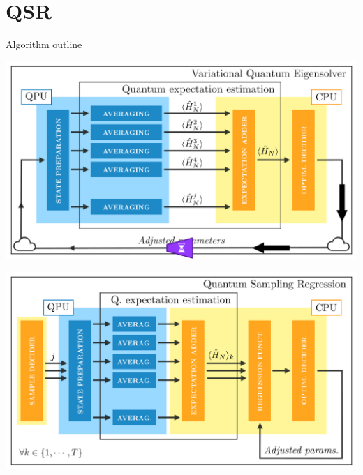 
\section{QSR}


\begin{frame}[allowframebreaks]{Algorithm outline}

  \begin{minipage}[c]{\linewidth}
    \begin{center}
      \includegraphics[width=.7\paperwidth]{Figures/VQE-bottleneck}
    \end{center}
  \end{minipage}

\break

  \begin{minipage}[c]{\linewidth}
    \begin{center}
      \includegraphics[width=.7\paperwidth]{Figures/chapter05/QSR}
    \end{center}
  \end{minipage}


\end{frame}
